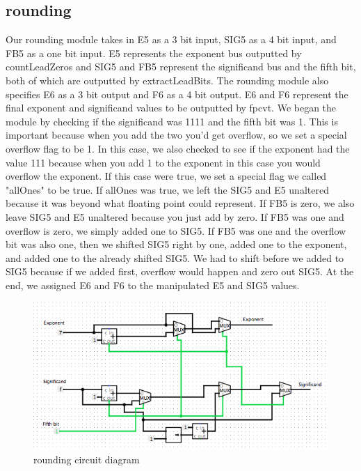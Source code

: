 \documentclass{article}
\begin{document}
\subsection*{rounding}
Our rounding module takes in E5 as a 3 bit input, SIG5 as a 4 bit input, and FB5 as a one bit input. E5 represents the exponent bus outputted by countLeadZeros and SIG5 and FB5 represent the significand bus and the fifth bit, both of which are outputted by extractLeadBits. The rounding module also specifies E6 as a 3 bit output and F6 as a 4 bit output. E6 and F6 represent the final exponent and significand values to be outputted by fpcvt. We began the module by checking if the significand was 1111 and the fifth bit was 1. This is important because when you add the two you'd get overflow, so we set a special overflow flag to be 1. In this case, we also checked to see if the exponent had the value 111 because when you add 1 to the exponent in this case you would overflow the exponent. If this case were true, we set a special flag we called "allOnes" to be true. If allOnes was true, we left the SIG5 and E5 unaltered because it was beyond what floating point could represent. If FB5 is zero, we also leave SIG5 and E5 unaltered because you just add by zero. If FB5 was one and overflow is zero, we simply added one to SIG5. If FB5 was one and the overflow bit was also one, then we shifted SIG5 right by one, added one to the exponent, and added one to the already shifted SIG5. We had to shift before we added to SIG5 because if we added first, overflow would happen and zero out SIG5. At the end, we assigned E6 and F6 to the manipulated E5 and SIG5 values.

\begin{figure}[H]
	\begin{center}
		\includegraphics[width=1\textwidth]{RoundingCD.png} 
		\caption{rounding circuit diagram}
	\end{center}
\end{figure}
\end{document}
